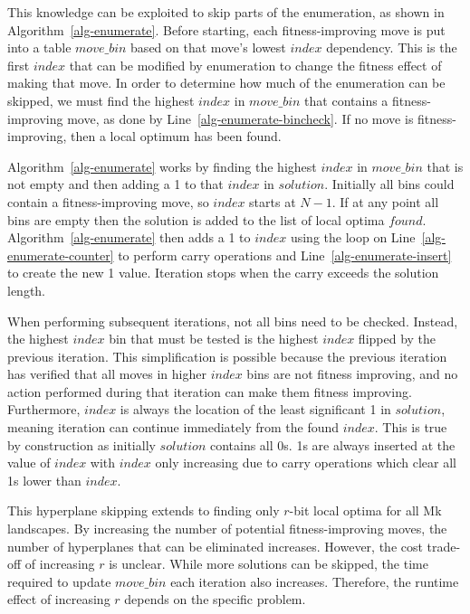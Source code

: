 \documentclass[runningheads,a4paper]{llncs}
\begin{document}
This knowledge can be exploited to skip parts of the enumeration,
as shown in Algorithm~\ref{alg-enumerate}.
Before starting, each fitness-improving move is put into a table $move\_bin$
based on that move's lowest $index$ dependency. This is the first $index$ that
can be modified by enumeration to change the fitness effect of making that move.
In order to determine how much of the enumeration can be skipped, we must find
the highest $index$ in $move\_bin$ that contains a fitness-improving move,
as done by Line~\ref{alg-enumerate-bincheck}. If no move is fitness-improving,
then a local optimum has been found.

Algorithm~\ref{alg-enumerate} works by finding the highest $index$ in $move\_bin$
that is not empty and then adding a 1 to that $index$ in $solution$. Initially
all bins could contain a fitness-improving move, so $index$ starts at $N-1$.
If at any point all bins are empty then the solution is added to the list of
local optima $found$. Algorithm~\ref{alg-enumerate} then
adds a 1 to $index$ using the loop on Line~\ref{alg-enumerate-counter}
to perform carry operations and Line~\ref{alg-enumerate-insert} to create the new 1 value.
Iteration stops when the carry exceeds the solution length.

When performing subsequent iterations, not all bins need to be checked. Instead, the highest $index$
bin that must be tested is the highest $index$ flipped by the previous iteration. This
simplification is possible because
the previous iteration has verified that all moves in higher $index$ bins are not fitness improving, and no action performed during
that iteration can make them fitness improving.
Furthermore, $index$ is always the location of the least significant 1 in $solution$, meaning
iteration can continue immediately from the found $index$. This is true by construction
as initially $solution$ contains all 0s. 1s are always inserted at the value of $index$
with $index$ only increasing due to carry operations which clear all 1s lower than $index$.

This hyperplane skipping extends to finding only $r$-bit local optima for all Mk landscapes.
By increasing the number of potential fitness-improving moves, the number of hyperplanes that
can be eliminated increases. However, the cost trade-off of increasing $r$ is unclear.
While more solutions can be skipped, the time required to update $move\_bin$ each iteration
also increases. Therefore, the runtime effect of increasing $r$
depends on the specific problem.
\end{document}
